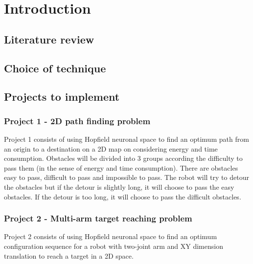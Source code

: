 \chapter{Introduction}
\label{cha:introduction}
\section{Literature review}
\label{sec:review}

\section{Choice of technique}
\label{sec:choice}

\section{Projects to implement}
\label{sec:projects}

\subsection{Project 1 - 2D path finding problem}
\label{ssec:project1}

Project 1 consists of using Hopfield neuronal space to find an optimum path from an origin to a destination on a 2D map
on considering energy and time consumption.
Obstacles will be divided into 3 groups according the difficulty to pass them (in the sense of energy and time consumption).
There are obstacles easy to pass, difficult to pass and impossible to pass.
The robot will try to detour the obstacles but if the detour is slightly long, it will choose to pass the easy obstacles.
If the detour is too long, it will choose to pass the difficult obstacles.


\subsection{Project 2 - Multi-arm target reaching problem}
\label{ssec:project2}

Project 2 consists of using Hopfield neuronal space to find an optimum configuration sequence for a robot
with two-joint arm and XY dimension translation to reach a target in a 2D space.
